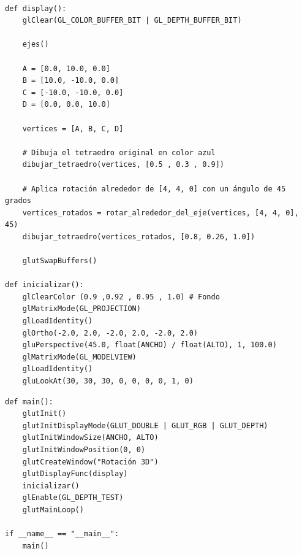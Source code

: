 \documentclass[a4paper]{article}
\begin{document}
\begin{center}
\begin{mycodeboxl}
\begin{lstlisting}

def display():
    glClear(GL_COLOR_BUFFER_BIT | GL_DEPTH_BUFFER_BIT)

    ejes()

    A = [0.0, 10.0, 0.0]
    B = [10.0, -10.0, 0.0]
    C = [-10.0, -10.0, 0.0]
    D = [0.0, 0.0, 10.0]

    vertices = [A, B, C, D]

    # Dibuja el tetraedro original en color azul
    dibujar_tetraedro(vertices, [0.5 , 0.3 , 0.9])

    # Aplica rotación alrededor de [4, 4, 0] con un ángulo de 45 grados
    vertices_rotados = rotar_alrededor_del_eje(vertices, [4, 4, 0], 45)
    dibujar_tetraedro(vertices_rotados, [0.8, 0.26, 1.0])

    glutSwapBuffers()

def inicializar():
    glClearColor (0.9 ,0.92 , 0.95 , 1.0) # Fondo
    glMatrixMode(GL_PROJECTION)
    glLoadIdentity()
    glOrtho(-2.0, 2.0, -2.0, 2.0, -2.0, 2.0)
    gluPerspective(45.0, float(ANCHO) / float(ALTO), 1, 100.0)
    glMatrixMode(GL_MODELVIEW)
    glLoadIdentity()
    gluLookAt(30, 30, 30, 0, 0, 0, 0, 1, 0)
\end{lstlisting}
\end{mycodeboxl}
\end{center}

\begin{center}
\begin{mycodebox}
\begin{lstlisting}
def main():
    glutInit()
    glutInitDisplayMode(GLUT_DOUBLE | GLUT_RGB | GLUT_DEPTH)
    glutInitWindowSize(ANCHO, ALTO)
    glutInitWindowPosition(0, 0)
    glutCreateWindow("Rotación 3D")
    glutDisplayFunc(display)
    inicializar()
    glEnable(GL_DEPTH_TEST)
    glutMainLoop()

if __name__ == "__main__":
    main()
\end{lstlisting}
\end{mycodebox}
\end{center}
\end{document}
